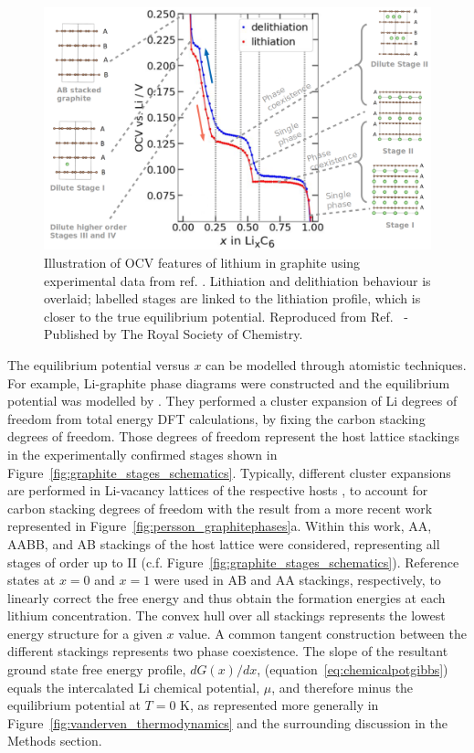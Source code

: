 \documentclass[../main.tex]{subfiles}
\begin{document}
\begin{figure}
    \centering
    \includegraphics[scale=1.2]{figures/ocv_and_stages.png}
    \caption{Illustration of OCV features of lithium in graphite using experimental data from ref. . Lithiation and delithiation behaviour is overlaid; labelled stages are linked to the lithiation profile, which is closer to the true equilibrium potential. Reproduced from Ref.~ - Published by The Royal Society of Chemistry.}
    \label{fig:expt_ocv}
\end{figure}

The equilibrium potential versus $x$ can be modelled through atomistic techniques. For example, Li-graphite phase diagrams were constructed and the equilibrium potential was modelled by \citeauthor{persson2010} \cite{persson2010}. They performed a cluster expansion of Li degrees of freedom from total energy DFT calculations, by fixing the carbon stacking degrees of freedom. Those degrees of freedom represent the host lattice stackings in the experimentally confirmed stages shown in Figure~\ref{fig:graphite_stages_schematics}. Typically, different cluster expansions are performed in Li-vacancy lattices of the respective hosts \cite{persson2010,hazrati_li_2014,Mercer2021}, to account for carbon stacking degrees of freedom with the result from a more recent work \cite{Mercer2021} represented in Figure~\ref{fig:persson_graphitephases}a. Within this work, AA, AABB, and AB stackings of the host lattice were considered, representing all stages of order up to II (c.f. Figure~\ref{fig:graphite_stages_schematics}). Reference states at $x=0$ and $x=1$ were used in AB and AA stackings, respectively, to linearly correct the free energy and thus obtain the formation energies at each lithium concentration. The convex hull over all stackings represents the lowest energy structure for a given $x$ value. A common tangent construction between the different stackings represents two phase coexistence. The slope of the resultant ground state free energy profile, $dG(x)/dx$, (equation~\ref{eq:chemicalpotgibbs}) equals the intercalated Li chemical potential, $\mu$, and therefore minus the equilibrium potential at $T=0$ K, as represented more generally in Figure~\ref{fig:vanderven_thermodynamics} and the surrounding discussion in the Methods section. 
\end{document}
